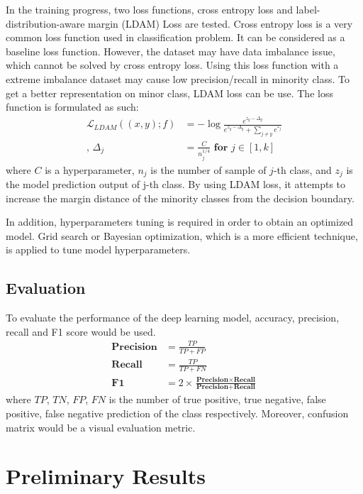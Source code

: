 \documentclass[10pt,twocolumn,letterpaper]{article}
\begin{document}
In the training progress, two loss functions, cross entropy loss and label-distribution-aware margin (LDAM) Loss\cite{cao_learning_2019} are tested. Cross entropy loss is a very common loss function used in classification problem. It can be considered as a baseline loss function. However, the dataset may have data imbalance issue, which cannot be solved by cross entropy loss. Using this loss function with a extreme imbalance dataset may cause low precision/recall in minority class. To get a better representation on minor class, LDAM loss can be use. The loss function is formulated as such:
\begin{align}
    \mathcal{L}_{LDAM}((x, y); f) &= -\log{\frac{e^{z_y - \Delta_y}}{e^{z_y - \Delta_y} + \sum_{j \ne y}e^{z_j}}}\\
    \text{, }\Delta_j &= \frac{C}{n^{1/4}_j} \textbf{ for } j \in [1,k]
\end{align}
where $C$ is a hyperparameter, $n_j$ is the number of sample of $j$-th class, and $z_j$ is the model prediction output of j-th class. By using LDAM loss, it attempts to increase the margin distance of the minority classes from the decision boundary.

In addition, hyperparameters tuning is required in order to obtain an optimized model. Grid search or Bayesian optimization, which is a more efficient technique, is applied to tune model hyperparameters.

\subsection{Evaluation}
To evaluate the performance of the deep learning model, accuracy, precision, recall and F1 score would be used.
\begin{align}
    \textbf{Precision} &= \frac{TP}{TP+FP}\\
    \textbf{Recall} &= \frac{TP}{TP+FN}\\
    \textbf{F1} &= 2 \times \frac{\textbf{Precision} \times \textbf{Recall}}{\textbf{Precision} + \textbf{Recall}}
\end{align}
where $TP$, $TN$, $FP$, $FN$ is the number of true positive, true negative, false positive, false negative prediction of the class respectively. Moreover, confusion matrix would be a visual evaluation metric.


\section{Preliminary Results}
\end{document}
